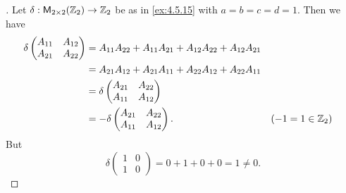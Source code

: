\begin{proof}[]
  Let \(\delta : \mathsf{M}_{{2} \times 2}({\mathbb{Z}_2}) \to \mathbb{Z}_2\) be as in \cref{ex:4.5.15} with \(a = b = c = d = 1\).
  Then we have
  \begin{align*}
    \delta\begin{pmatrix}
            A_{1 1} & A_{1 2} \\
            A_{2 1} & A_{2 2}
          \end{pmatrix} & = A_{1 1} A_{2 2} + A_{1 1} A_{2 1} + A_{1 2} A_{2 2} + A_{1 2} A_{2 1}                         \\
                          & = A_{2 1} A_{1 2} + A_{2 1} A_{1 1} + A_{2 2} A_{1 2} + A_{2 2} A_{1 1}                       \\
                          & = \delta\begin{pmatrix}
                                      A_{2 1} & A_{2 2} \\
                                      A_{1 1} & A_{1 2}
                                    \end{pmatrix}                                                                     \\
                          & = -\delta\begin{pmatrix}
                                       A_{2 1} & A_{2 2} \\
                                       A_{1 1} & A_{1 2}
                                     \end{pmatrix}.                                                &  & (-1 = 1 \in \mathbb{Z}_2)
  \end{align*}
  But
  \[
    \delta\begin{pmatrix}
      1 & 0 \\
      1 & 0
    \end{pmatrix} = 0 + 1 + 0 + 0 = 1 \neq 0.
  \]
\end{proof}

